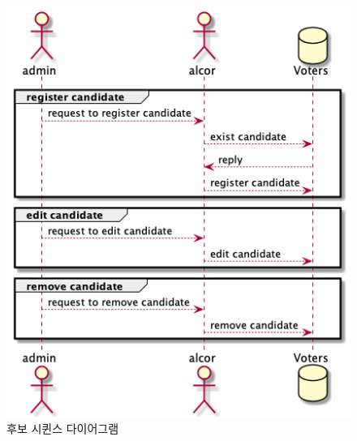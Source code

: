 \documentclass[10pt,a4paper,left=15mm,right=15mm,top=20mm,bottom=20mm]{article}
\begin{document}
    \begin{figure}[h]
        \begin{center}
            \includegraphics[width=15cm]{candidate-reg}
            \caption{후보 시퀸스 다이어그램}
        \end{center}
    \end{figure}
\end{document}
